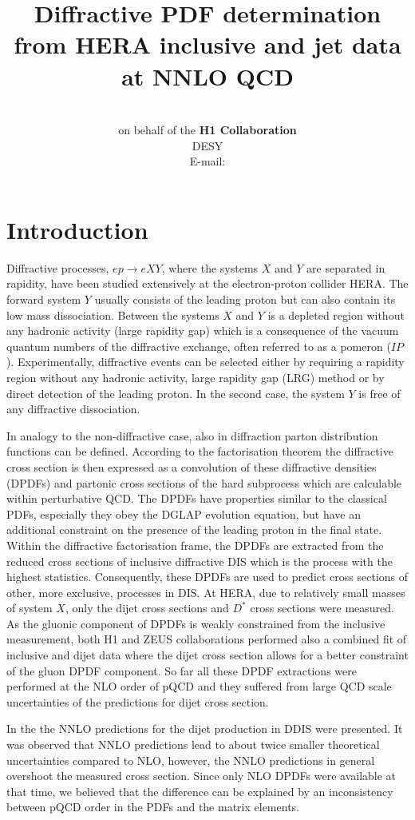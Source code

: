 \documentclass{PoS}
\title{Diffractive PDF determination from HERA inclusive and jet data at NNLO QCD}
\author{\speaker{Radek \v{Z}leb\v{c}\'{i}k}\\ on behalf of the \textup{\textbf{H1 Collaboration}} \\
        DESY\\
        E-mail: \email{radek.zlebcik@desy.de}}
\newcommand{\IP}{I\!\!P}
\begin{document}
\section{Introduction}

Diffractive processes, $ep \to  eXY$, where the systems $X$ and $Y$ are separated in rapidity, have been studied extensively at the electron-proton collider HERA.
The forward system $Y$ usually consists of the leading proton but can also contain its low mass dissociation.
Between the systems $X$ and $Y$ is a depleted region without any hadronic activity (large rapidity gap) which is a consequence of the vacuum quantum numbers of the diffractive exchange, often referred to as a pomeron ($\IP$).
Experimentally, diffractive events can be selected either by requiring a rapidity region without any hadronic activity, large rapidity gap (LRG) method or by direct detection of the leading proton.
In the second case, the system $Y$ is free of any diffractive dissociation.

In analogy to the non-diffractive case, also in diffraction parton distribution functions can be defined.
According to the factorisation theorem \cite{Collins:1997sr} the diffractive cross section is then expressed as a convolution of these diffractive densities (DPDFs) and partonic cross sections of the hard subprocess which are calculable within perturbative QCD.
The DPDFs have properties similar to the classical PDFs, especially they obey the DGLAP evolution equation, but have an additional constraint on the presence of the leading proton in the final state.
Within the diffractive factorisation frame, the DPDFs are extracted from the reduced cross sections of inclusive diffractive DIS \cite{Aktas:2006hy} which is the process with the highest statistics.
Consequently, these DPDFs are used to predict cross sections of other, more exclusive, processes in DIS.
At HERA, due to relatively small masses of system $X$, only the dijet cross sections and $D^{*}$ cross sections were measured.
As the gluonic component of DPDFs is weakly constrained from the inclusive measurement, both H1 and ZEUS collaborations performed also a combined fit of inclusive and dijet data \cite{Aktas:2007bv,Chekanov:2009aa} where the dijet cross section allows for a better constraint of the gluon DPDF component.
So far all these DPDF extractions were performed at the NLO order of pQCD and they suffered from large QCD scale uncertainties of the predictions for dijet cross section.

In the \cite{Britzger:2018zvv} the NNLO predictions for the dijet production in DDIS were presented.
It was observed that NNLO predictions lead to about twice smaller theoretical uncertainties compared to NLO, however, the NNLO predictions in general overshoot the measured cross section.
Since only NLO DPDFs were available at that time, we believed that the difference can be explained by an inconsistency between pQCD order in the PDFs and the matrix elements.
\end{document}
